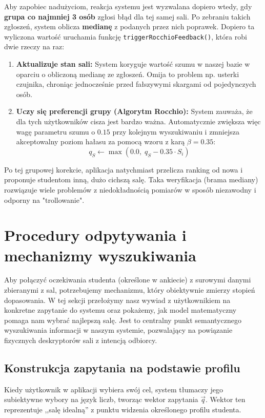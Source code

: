 \documentclass[14pt,a4paper]{extarticle}
\begin{document}
Aby zapobiec nadużyciom, reakcja systemu jest wyzwalana dopiero wtedy, gdy \textbf{grupa co najmniej 3 osób} zgłosi błąd dla tej samej sali. Po zebraniu takich zgłoszeń, system oblicza \textbf{medianę} z podanych przez nich poprawek. Dopiero ta wyliczona wartość uruchamia funkcję \texttt{triggerRocchioFeedback()}, która robi dwie rzeczy na raz:
\begin{enumerate}
    \item \textbf{Aktualizuje stan sali:} System koryguje wartość szumu w naszej bazie w oparciu o obliczoną medianę ze zgłoszeń. Omija to problem np. usterki czujnika, chroniąc jednocześnie przed fałszywymi skargami od pojedynczych osób.
    \item \textbf{Uczy się preferencji grupy (Algorytm Rocchio):} System zauważa, że dla tych użytkowników cisza jest bardzo ważna. Automatycznie zwiększa więc wagę parametru szumu o $0.15$ przy kolejnym wyszukiwaniu i zmniejsza akceptowalny poziom hałasu za pomocą wzoru z karą $\beta = 0.35$:
    \begin{equation}
        q_S \leftarrow \max(0.0,\; q_S - 0.35 \cdot S_i)
    \end{equation}
\end{enumerate}

Po tej grupowej korekcie, aplikacja natychmiast przelicza ranking od nowa i proponuje studentom inną, dużo cichszą salę. Taka weryfikacja (brama mediany) rozwiązuje wiele problemów z niedokładnością pomiarów w sposób niezawodny i odporny na "trollowanie".

\section{Procedury odpytywania i mechanizmy wyszukiwania}

Aby połączyć oczekiwania studenta (określone w ankiecie) z surowymi danymi zbieranymi z sal, potrzebujemy mechanizmu, który obiektywnie zmierzy stopień dopasowania. W tej sekcji przełożymy nasz wywiad z użytkownikiem na konkretne zapytanie do systemu oraz pokażemy, jak model matematyczny pomaga nam wybrać najlepszą salę. Jest to centralny punkt semantycznego wyszukiwania informacji w naszym systemie, pozwalający na powiązanie fizycznych deskryptorów sali z intencją odbiorcy.

\subsection{Konstrukcja zapytania na podstawie profilu}
Kiedy użytkownik w aplikacji wybiera swój cel, system tłumaczy jego subiektywne wybory na język liczb, tworząc wektor zapytania $\vec{q}$. Wektor ten reprezentuje ,,salę idealną'' z punktu widzenia określonego profilu studenta.
\end{document}
